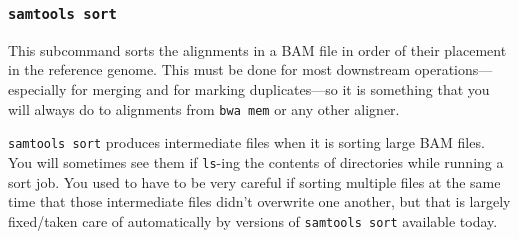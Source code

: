 \documentclass[]{krantz}
\makeatletter
\newenvironment{Shaded}{\begin{snugshade}}{\end{snugshade}}
\newcommand{\CommentTok}[1]{\textcolor[rgb]{0.37,0.37,0.37}{\textit{#1}}}
\newcommand{\ExtensionTok}[1]{#1}
\newcommand{\FunctionTok}[1]{\textcolor[rgb]{0,0,0}{#1}}
\newcommand{\KeywordTok}[1]{\textcolor[rgb]{0.27,0.27,0.27}{\textbf{#1}}}
\newcommand{\NormalTok}[1]{#1}
\newcommand{\OperatorTok}[1]{\textcolor[rgb]{0.43,0.43,0.43}{\textbf{#1}}}
\newcommand{\StringTok}[1]{\textcolor[rgb]{0.5,0.5,0.5}{#1}}
\newenvironment{kframe}{%
\medskip{}
\setlength{\fboxsep}{.8em}
 \def\at@end@of@kframe{}%
 \ifinner\ifhmode%
  \def\at@end@of@kframe{\end{minipage}}%
  \begin{minipage}{\columnwidth}%
 \fi\fi%
 \def\FrameCommand##1{\hskip\@totalleftmargin \hskip-\fboxsep
 \colorbox{shadecolor}{##1}\hskip-\fboxsep
     \hskip-\linewidth \hskip-\@totalleftmargin \hskip\columnwidth}%
 \MakeFramed {\advance\hsize-\width
   \@totalleftmargin\z@ \linewidth\hsize
   \@setminipage}}%
 {\par\unskip\endMakeFramed%
 \at@end@of@kframe}
\renewenvironment{Shaded}{\begin{kframe}}{\end{kframe}}
\makeatother
\begin{document}
\hypertarget{samtools-sort}{%
\subsubsection{\texorpdfstring{\texttt{samtools\ sort}}{samtools sort}}\label{samtools-sort}}

This subcommand sorts the alignments in a BAM file in order of their placement
in the reference genome. This must be done for
most downstream operations---especially for merging and for marking duplicates---so
it is something that you will always do to alignments from \texttt{bwa\ mem} or any
other aligner.

\begin{Shaded}
\end{Shaded}

\texttt{samtools\ sort} produces intermediate files when it is sorting large BAM files.
You will sometimes see them if \texttt{ls}-ing the contents of directories while running
a sort job.
You used to have to be very careful if sorting multiple files at the same time
that those intermediate files didn't overwrite one another, but that is largely
fixed/taken care of automatically by versions of \texttt{samtools\ sort} available today.
\end{document}
